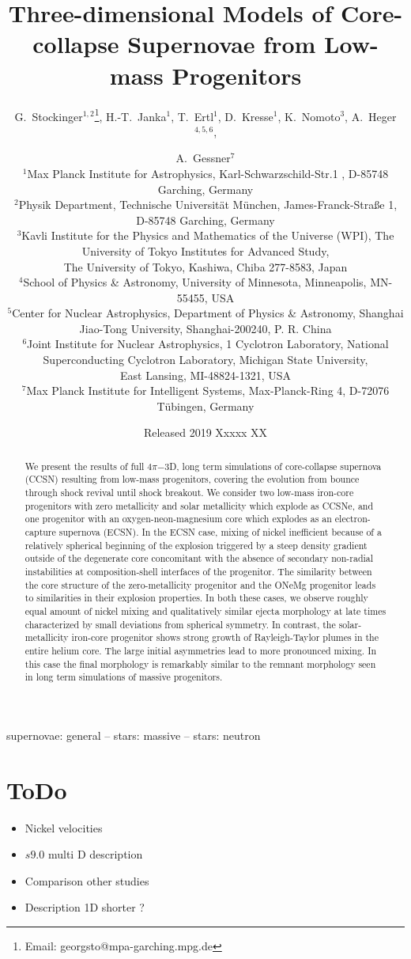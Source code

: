 \documentclass[fleqn,usenatbib]{mnras}
\title{Three-dimensional Models of Core-collapse Supernovae from Low-mass Progenitors}
\author[G. Stockinger et. al]{
 G.~Stockinger$^{1,2}$\thanks{Email: georgsto@mpa-garching.mpg.de},
 H.-T.~Janka$^1$,
 T.~Ertl$^1$,
 D.~Kresse$^1$,
 K.~Nomoto$^3$,
 A.~Heger$^{4,5,6}$,\and
 A.~Gessner$^7$
 \\
$^1$Max Planck Institute for Astrophysics, Karl-Schwarzschild-Str.1 , D-85748 Garching, Germany\\
$^2$Physik Department, Technische Universit\"at M\"unchen, James-Franck-Stra{\ss}e 1, D-85748 Garching, Germany\\
$^3$Kavli Institute for the Physics and Mathematics of the Universe (WPI), The University of Tokyo Institutes for Advanced Study,\\  \hspace{0.08cm} The University of Tokyo, Kashiwa, Chiba 277-8583, Japan\\
$^4$School of Physics \& Astronomy, University of Minnesota, Minneapolis, MN-55455, USA \\
$^5$Center for Nuclear Astrophysics, Department of Physics \& Astronomy, Shanghai Jiao-Tong University, Shanghai-200240, P. R. China \\
$^6$Joint Institute for Nuclear Astrophysics, 1 Cyclotron Laboratory, National Superconducting Cyclotron Laboratory, Michigan State University,\\ \hspace{0.08cm} East Lansing, MI-48824-1321, USA \\
$^7$Max Planck Institute for Intelligent Systems, Max-Planck-Ring 4, D-72076 T\"ubingen, Germany \\
}
\date{Released 2019 Xxxxx XX}
\begin{document}
\label{firstpage}
\pagerange{\pageref{firstpage}--\pageref{lastpage}}
\maketitle
{}

\begin{abstract}
We present the results of full $4\pi\mathord{-}$3D, long term simulations of core-collapse supernova (CCSN) resulting from low-mass progenitors, covering the evolution from bounce through shock revival until shock breakout. We consider two low-mass iron-core progenitors with zero metallicity and solar metallicity which explode as CCSNe, and one progenitor with an oxygen-neon-magnesium core which explodes as an electron-capture supernova (ECSN). In the ECSN case, mixing of nickel inefficient because of a relatively spherical beginning of the explosion triggered by a steep density gradient outside of the degenerate core concomitant with the absence of secondary non-radial instabilities at composition-shell interfaces of the progenitor. The similarity between the core structure of the zero-metallicity progenitor and the ONeMg progenitor leads to similarities in their explosion properties. In both these cases, we observe roughly equal amount of nickel mixing and qualitatively similar ejecta morphology at late times characterized by small deviations from spherical symmetry. In contrast, the solar-metallicity iron-core progenitor shows strong growth of Rayleigh-Taylor plumes in the entire helium core. The large initial asymmetries lead to more pronounced mixing. In this case the final morphology is remarkably similar to the remnant morphology seen in long term simulations of massive progenitors.
\end{abstract}

\begin{keywords}
  supernovae: general -- stars: massive -- stars: neutron
\end{keywords}

\noindent

\section{ToDo}
\begin{itemize}
    \item Nickel velocities
    \item $s9.0$ multi D description
    \item Comparison other studies
    \item Description 1D shorter ?
\end{itemize}
\end{document}
